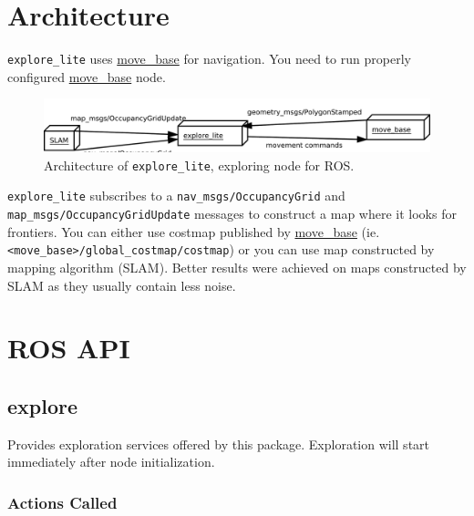 \section{Architecture}

\texttt{explore\_lite} uses \href{http://wiki.ros.org/move_base}{move\_base} for navigation. You need to run properly configured \href{http://wiki.ros.org/move_base}{move\_base} node.

\begin{figure}
    \centering
    \includegraphics[width=\textwidth]{../img/explore_architecture.pdf}
    \caption[Architecture of \texttt{explore\_lite}]{Architecture of \texttt{explore\_lite}, exploring node for \gls{ROS}.}
    \label{fig:explorearchitecture}
\end{figure}

\texttt{explore\_lite} subscribes to a \texttt{nav\_msgs/Occu\-pan\-cy\-Grid} and \texttt{map\_msgs/Occu\-pan\-cy\-Grid\-Up\-da\-te} messages to construct a map where it looks for frontiers. You can either use costmap published by \href{http://wiki.ros.org/move_base}{move\_base} (ie. \texttt{<mo\-ve\_ba\-se>/glo\-bal\_cost\-map/\-cost\-map}) or you can use map constructed by mapping algorithm (SLAM). Better results were achieved on maps constructed by SLAM as they usually contain less noise.

\section{ROS API}
\subsection{explore}

Provides exploration services offered by this package. Exploration will start immediately after node initialization.

\subsubsection{Actions Called}

